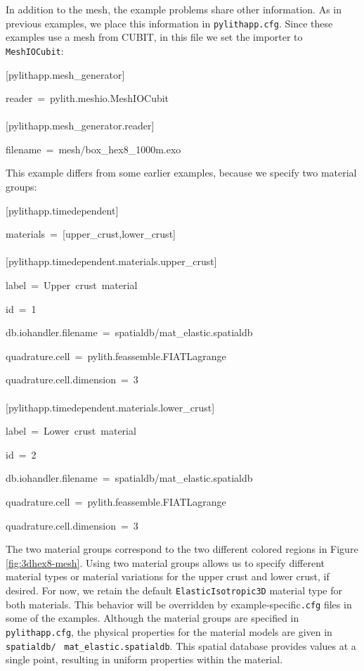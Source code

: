In addition to the mesh, the example problems share other information.
As in previous examples, we place this information in \texttt{pylithapp.cfg}.
Since these examples use a mesh from CUBIT, in this file we set the
importer to \texttt{MeshIOCubit}:
\begin{lyxcode}
{[}pylithapp.mesh\_generator{]}

reader~=~pylith.meshio.MeshIOCubit~\\
~\\


{[}pylithapp.mesh\_generator.reader{]}

filename~=~mesh/box\_hex8\_1000m.exo
\end{lyxcode}
This example differs from some earlier examples, because we specify
two material groups:
\begin{lyxcode}
{[}pylithapp.timedependent{]}

materials~=~{[}upper\_crust,lower\_crust{]}~\\
~\\


{[}pylithapp.timedependent.materials.upper\_crust{]}

label~=~Upper~crust~material

id~=~1

db.iohandler.filename~=~spatialdb/mat\_elastic.spatialdb

quadrature.cell~=~pylith.feassemble.FIATLagrange

quadrature.cell.dimension~=~3~\\
~\\


{[}pylithapp.timedependent.materials.lower\_crust{]}

label~=~Lower~crust~material

id~=~2

db.iohandler.filename~=~spatialdb/mat\_elastic.spatialdb

quadrature.cell~=~pylith.feassemble.FIATLagrange

quadrature.cell.dimension~=~3
\end{lyxcode}
The two material groups correspond to the two different colored regions
in Figure \ref{fig:3dhex8-mesh}. Using two material groups allows
us to specify different material types or material variations for
the upper crust and lower crust, if desired. For now, we retain the
default \texttt{ElasticIsotropic3D} material type for both materials.
This behavior will be overridden by example-specific\texttt{.cfg}
files in some of the examples. Although the material groups are specified
in \texttt{pylithapp.cfg}, the physical properties for the material
models are given in \texttt{spatialdb/}~\linebreak{}
\texttt{mat\_elastic.spatialdb}. This spatial database provides values
at a single point, resulting in uniform properties within the material.


